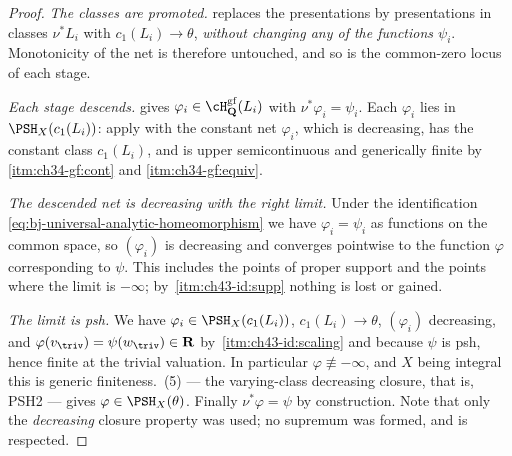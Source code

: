 \begin{proof}
\emph{The classes are promoted.}  
replaces the presentations by presentations in classes $\nu^*L_i$ with
$c_1(L_i)\to\theta$, \emph{without changing any of the functions
$\psi_i$}.  Monotonicity of the net is therefore untouched, and so is the
common-zero locus of each stage.

\emph{Each stage descends.}   gives
$\varphi_i\in\cH^{\mathrm{gf}}_{\mathbf Q}(L_i)$ with
$\nu^*\varphi_i=\psi_i$.  Each $\varphi_i$ lies in
$\PSH_X(c_1(L_i))$: apply  with the constant net
$\varphi_i$, which is decreasing, has the constant class $c_1(L_i)$, and
is upper semicontinuous and generically finite by
\,\cref{itm:ch34-gf:cont} and
\cref{itm:ch34-gf:equiv}.

\emph{The descended net is decreasing with the right limit.}  Under the
identification \eqref{eq:bj-universal-analytic-homeomorphism} we have
$\varphi_i=\psi_i$ as functions on the common space, so
$(\varphi_i)$ is decreasing and converges pointwise to the function
$\varphi$ corresponding to $\psi$.  This includes the points of proper
support and the points where the limit is $-\infty$; by
\,\cref{itm:ch43-id:supp} nothing is
lost or gained.

\emph{The limit is psh.}  We have $\varphi_i\in\PSH_X(c_1(L_i))$,
$c_1(L_i)\to\theta$, $(\varphi_i)$ decreasing, and
$\varphi(v_\triv)=\psi(w_\triv)\in\mathbf R$ by
\,\cref{itm:ch43-id:scaling} and
because $\psi$ is psh, hence finite at the trivial valuation.  In
particular $\varphi\not\equiv-\infty$, and $X$ being integral this is
generic finiteness.  \,(5) --- the
varying-class decreasing closure, that is, PSH2 --- gives
$\varphi\in\PSH_X(\theta)$.  Finally $\nu^*\varphi=\psi$ by
construction.  Note that only the \emph{decreasing} closure property was
used; no supremum was formed, and  is respected.
\end{proof}

